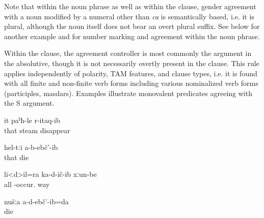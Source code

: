 Note that within the noun phrase as well as within the clause, gender agreement with a noun modified by a numeral other than \textit{ca}  is semantically based, i.e. it is plural, although the noun itself does not bear an overt plural suffix. See  below for another example and  for number marking and agreement within the noun phrase.

Within the clause, the agreement controller is most commonly the argument in the absolutive, though it is not necessarily overtly present in the clause. This rule applies independently of polarity, TAM features, and clause types, i.e. it is found with all finite and non-finite verb forms including various nominalized verb forms (participles, masdars). Examples  illustrate monovalent predicates agreeing with the S argument. 
%
\begin{exe}

		\ex	\label{ex:She disappeared like steam@11a}
		\gll	it	paˁħ-le	r-itaq-ib\\
			that	steam	disappear\\
		\glt	{}

		\ex	\label{ex:They did not die@11b}
		\gll	hel-tːi	a-b-ebč'-ib\\
			that	die\\
		\glt	{}

		\ex	\label{ex:All roads broke@11c}
		\gll	li<d>il=ra	ka-d-ič-ib	xːun-be\\
			all	-occur.	way\\
		\glt	{}

		\ex	\label{ex:We did not die@11d}
		\gll	nušːa	a-d-ebč'-ib=da\\
				die\\
		\glt	{}
\end{exe}

